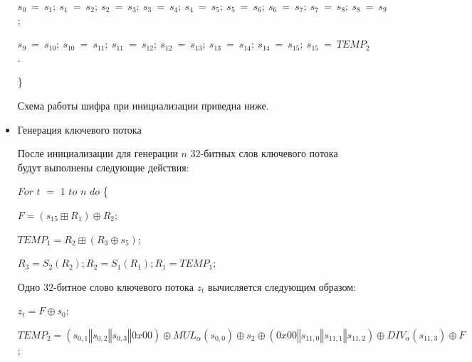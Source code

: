 \documentclass{./civarticle}
\begin{document}
\begin{itemize}
    \hspace{0.5cm}$s_0~=~s_1;~s_1~=~s_2;~s_2~=~s_3;~s_3~=~s_4;~s_4~=~s_5;~s_5~=~s_6;~s_6~=~s_7;~s_7~=~s_8;~s_8~=~s_9$;
    
    \hspace{0.5cm}$s_9~=~s_{10};~s_{10}~=~s_{11};~s_{11}~=~s_{12};~s_{12}~=~s_{13};~s_{13}~=~s_{14};~s_{14}~=~s_{15};~s_{15}~=~TEMP_2$.
    
\}

Схема работы шифра при инициализации приведна ниже.
\begin{figure}[h!]
\end{figure}

\item Генерация ключевого потока

После инициализации для генерации $n$ 32-битных слов ключевого потока будут выполнены следующие действия:

$For$ $t$ $=$ $1$ $to$ $n$ $do$ \{ 
    
    \hspace{0.5cm}$F = (s_{15} \boxplus R_1) \oplus R_2$;
    
    \hspace{0.5cm}$TEMP_1 = R_2 \boxplus (R_3 \oplus s_5)$;
    
    \hspace{0.5cm}$R_3 = S_2(R_2); R_2 = S_1(R_1); R_1 = TEMP_1$;

    Одно 32-битное слово ключевого потока $z_t$ вычисляется следующим образом:

    \hspace{0.5cm}$z_t = F \oplus s_0$;

    \hspace{0.5cm}$TEMP_2 = (s_{0, 1} \mathbin\Vert s_{0, 2} \mathbin\Vert s_{0, 3} \mathbin\Vert 0x00) \oplus MUL_\alpha(s_{0, 0}) \oplus s_2 \oplus (0x00 \mathbin\Vert s_{11, 0} \mathbin\Vert s_{11, 1} \mathbin\Vert s_{11, 2}) \oplus DIV_\alpha(s_{11, 3}) \oplus F$;


\end{itemize}
\end{document}
